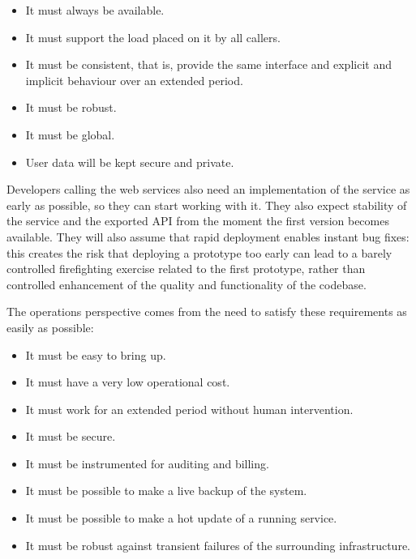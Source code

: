 \documentclass[draft]{report}
\begin{document}
\begin{itemize}

\item It must always be available.

\item It must support the load placed on it by all callers.

\item It must be consistent, that is, provide the same interface and
explicit and implicit behaviour over an extended period.

\item It must be robust.

\item It must be global.

\item User data will be kept secure and private.

\end{itemize}

Developers calling the web services also need an implementation of the
service as early as possible, so they can start working with it. They
also expect stability of the service and the exported API from the
moment the first version becomes available. They will also assume that
rapid deployment enables instant bug fixes: this creates the risk that
deploying a prototype too early can lead to a barely controlled
firefighting exercise related to the first prototype, rather than
controlled enhancement of the quality and functionality of the codebase.


The operations perspective comes from the need to satisfy these
requirements as easily as possible:

\begin{itemize}

\item It must be easy to bring up.

\item It must have a very low operational cost.

\item It must work for an extended period without human intervention.

\item It must be secure.

\item It must be instrumented for auditing and billing.

\item It must be possible to make a live backup of the system.

\item It must be possible to make a hot update of a running service.

\item It must be robust against transient failures of the surrounding
infrastructure.

\end{itemize}
\end{document}
